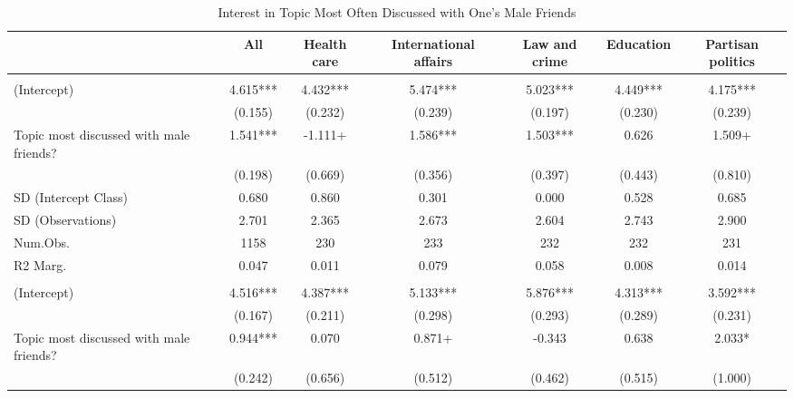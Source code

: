 \documentclass[
  letterpaper,
  DIV=11,
  numbers=noendperiod]{scrreprt}
\begin{document}
\begin{table}
\centering\centering
\caption{Interest in Topic Most Often Discussed with One's Male Friends \label{tab:lmeMaleFriends}}
\centering
\fontsize{6}{8}\selectfont
\begin{tabular}[t]{lcccccc}
\toprule
  & All & Health care & International affairs & Law and crime & Education & Partisan politics\\
\midrule
\addlinespace[0.5em]
\multicolumn{7}{l}{\textit{Boys}}\\
\midrule \hspace{1em}(Intercept) & 4.615*** & 4.432*** & 5.474*** & 5.023*** & 4.449*** & 4.175***\\
\hspace{1em} & (0.155) & (0.232) & (0.239) & (0.197) & (0.230) & (0.239)\\
\hspace{1em}Topic most discussed with male friends? & 1.541*** & -1.111+ & 1.586*** & 1.503*** & 0.626 & 1.509+\\
\hspace{1em} & (0.198) & (0.669) & (0.356) & (0.397) & (0.443) & (0.810)\\
\hspace{1em}SD (Intercept Class) & 0.680 & 0.860 & 0.301 & 0.000 & 0.528 & 0.685\\
\hspace{1em}SD (Observations) & 2.701 & 2.365 & 2.673 & 2.604 & 2.743 & 2.900\\
\hspace{1em}Num.Obs. & 1158 & 230 & 233 & 232 & 232 & 231\\
\hspace{1em}R2 Marg. & 0.047 & 0.011 & 0.079 & 0.058 & 0.008 & 0.014\\
\addlinespace[0.5em]
\multicolumn{7}{l}{\textit{Girls}}\\
\midrule \hspace{1em}(Intercept) & 4.516*** & 4.387*** & 5.133*** & 5.876*** & 4.313*** & 3.592***\\
\hspace{1em} & (0.167) & (0.211) & (0.298) & (0.293) & (0.289) & (0.231)\\
\hspace{1em}Topic most discussed with male friends? & 0.944*** & 0.070 & 0.871+ & -0.343 & 0.638 & 2.033*\\
\hspace{1em} & (0.242) & (0.656) & (0.512) & (0.462) & (0.515) & (1.000)\\

\end{tabular}
\end{table}
\end{document}
